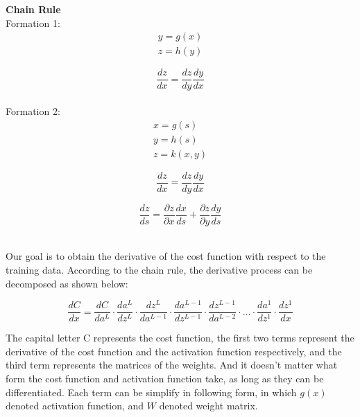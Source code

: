 \documentclass{article}
\begin{document}
    \begin{mdframed}[hidealllines=false,backgroundcolor=white!20]
        \textbf{Chain Rule}\\

    Formation 1:
    \begin{equation}
    \begin{aligned}
    y = g(x) \\
    z = h(y)
    \end{aligned}
    \end{equation}

    \begin{equation}
    \frac{d z}{d x}=\frac{d z}{d y} \frac{d y}{d x}
    \end{equation}\\

    Formation 2:
    \begin{equation}
    \begin{aligned}
    x = g(s)\\
    y = h(s)\\
    z = k(x,y)
    \end{aligned}
    \end{equation}

    \begin{equation}
    \frac{d z}{d x}=\frac{d z}{d y} \frac{d y}{d x}
    \end{equation}

    \begin{equation}
    \frac{d z}{d s}=\frac{\partial z}{\partial x} \frac{d x}{d s}+\frac{\partial z}{\partial y} \frac{d y}{d s}
    \end{equation}

    \end{mdframed}\\

    Our goal is to obtain the derivative of the cost function with respect to the training data. According to the chain rule, the derivative process can be decomposed as shown below:

    \begin{equation}
    \frac{d C}{d x} = \frac{d C}{d a^L} \cdot \frac{d a^L}{d z^L} \cdot \frac{d z^L}{d a^{L-1}} \cdot \frac{d a^{L-1}}{d z^{L-1}} \cdot \frac{d z^{L-1}}{d a^{L-2}} \cdot \ldots \cdot \frac{d a^1}{d z^1} \cdot \frac{d z^1}{d x}
    \end{equation}

    The capital letter C represents the cost function, the first two terms represent the derivative of the cost function and the activation function respectively, and the third term represents the matrices of the weights. And it doesn't matter what form the cost function and activation function take, as long as they can be differentiated. Each term can be simplify in following form, in which $g(x)$ denoted activation function, and $W$ denoted weight matrix.
\end{document}
